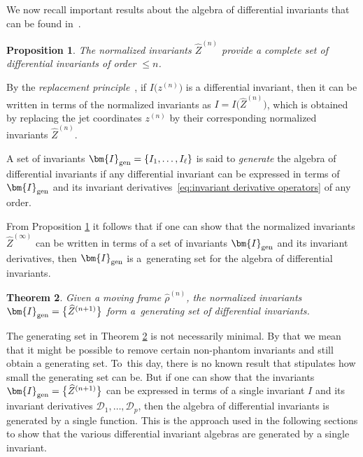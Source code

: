 \documentclass[10pt,a4paper]{amsart}
\numberwithin{equation}{section}
\newtheorem{Theorem}{Theorem}[section]
\newtheorem{Proposition}[Theorem]{Proposition}
 { \theoremstyle{definition}
\newtheorem{Definition}[Theorem]{Definition}
\newtheorem{Note}[Theorem]{Note}
\newtheorem{Example}[Theorem]{Example}
\newtheorem{Remark}[Theorem]{Remark} }
\newcommand{\D}{\mathcal{D}}
\newcommand{\n}{^{(n)}}
\begin{document}
We now recall important results about the algebra of differential invariants that can be found in~\cite{FO-1999,O-2007}.

\begin{Proposition}\label{prop:complete set}
The normalized invariants $\widehat{Z}\n$ provide a complete set of differential invariants of order $\leq n$.
\end{Proposition}

By the \emph{replacement principle}~\cite{FO-1999,M-2010}, if $I\big(z\n\big)$ is a differential invariant, then it can be written in terms of the normalized invariants as $I=I\big(\widehat{Z}\n\big)$, which is obtained by replacing the jet coordinates $z\n$ by their corresponding normalized invariants $\widehat{Z}\n$.

\begin{Definition}
A set of invariants $\bm{I}_{{\rm gen}}=\{I_1,\dots,I_\ell\}$ is said to \emph{generate} the algebra of dif\-fe\-ren\-tial invariants if any differential invariant can be expressed in terms of $\bm{I}_{{\rm gen}}$ and its invariant derivatives~\eqref{eq:invariant derivative operators} of any order.
\end{Definition}

From Proposition \ref{prop:complete set} it follows that if one can show that the normalized invariants $\widehat{Z}^{(\infty)}$ can be written in terms of a set of invariants $\bm{I}_{{\rm gen}}$ and its invariant derivatives, then $\bm{I}_{{\rm gen}}$ is a~generating set for the algebra of differential invariants.

\begin{Theorem}\label{thm:generating set}
Given a moving frame $\widehat{\rho}\n$, the normalized invariants $\bm{I}_{{\rm gen}} = \big\{\widehat{Z}^{(n+1)}\big\}$ form a~generating set of differential invariants.
\end{Theorem}

The generating set in Theorem \ref{thm:generating set} is not necessarily minimal. By that we mean that it might be possible to remove certain non-phantom invariants and still obtain a generating set. To~this day, there is no known result that stipulates how small the generating set can be. But if one can show that the invariants $\bm{I}_{{\rm gen}}=\big\{\widehat{Z}^{(n+1)}\big\}$ can be expressed in terms of a single invariant $I$ and its invariant derivatives $\D_1,\dots,\D_p$, then the algebra of differential invariants is generated by a single function. This is the approach used in the following sections to show that the various differential invariant algebras are generated by a single invariant.
\end{document}
